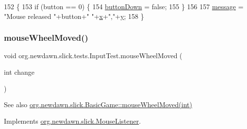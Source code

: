 \begin{DoxyCode}
152                                                         \{
153         \textcolor{keywordflow}{if} (button == 0) \{
154             \mbox{\hyperlink{classorg_1_1newdawn_1_1slick_1_1tests_1_1_input_test_aaa3058a9f1d4a84c36dfc06c5e43944b}{buttonDown}} = \textcolor{keyword}{false};
155         \}
156         
157         \mbox{\hyperlink{classorg_1_1newdawn_1_1slick_1_1tests_1_1_input_test_a998b4c1fcea34c27835b531bd6afa539}{message}} = \textcolor{stringliteral}{"Mouse released "}+button+\textcolor{stringliteral}{" "}+\mbox{\hyperlink{classorg_1_1newdawn_1_1slick_1_1tests_1_1_input_test_a95f99c94f1e661a629501a3205d78c15}{x}}+\textcolor{stringliteral}{","}+\mbox{\hyperlink{classorg_1_1newdawn_1_1slick_1_1tests_1_1_input_test_a18ce34ad5ddc268a0420c747d5b19d05}{y}};
158     \}
\end{DoxyCode}
\mbox{\label{classorg_1_1newdawn_1_1slick_1_1tests_1_1_input_test_af9fe762d2e11ec43fd4676e7678649bd}} 
\subsubsection{\texorpdfstring{mouse\+Wheel\+Moved()}{mouseWheelMoved()}}
{\footnotesize\ttfamily void org.\+newdawn.\+slick.\+tests.\+Input\+Test.\+mouse\+Wheel\+Moved (\begin{DoxyParamCaption}\item[{int}]{change }\end{DoxyParamCaption})\hspace{0.3cm}{\ttfamily [inline]}}

\begin{DoxySeeAlso}{See also}
\mbox{\hyperlink{classorg_1_1newdawn_1_1slick_1_1_basic_game_a28f0cdd4678843d738312a0fa49d5cc3}{org.\+newdawn.\+slick.\+Basic\+Game\+::mouse\+Wheel\+Moved(int)}} 
\end{DoxySeeAlso}


Implements \mbox{\hyperlink{interfaceorg_1_1newdawn_1_1slick_1_1_mouse_listener_ad7e49c969e1f0315ecdf238f715953d1}{org.\+newdawn.\+slick.\+Mouse\+Listener}}.


